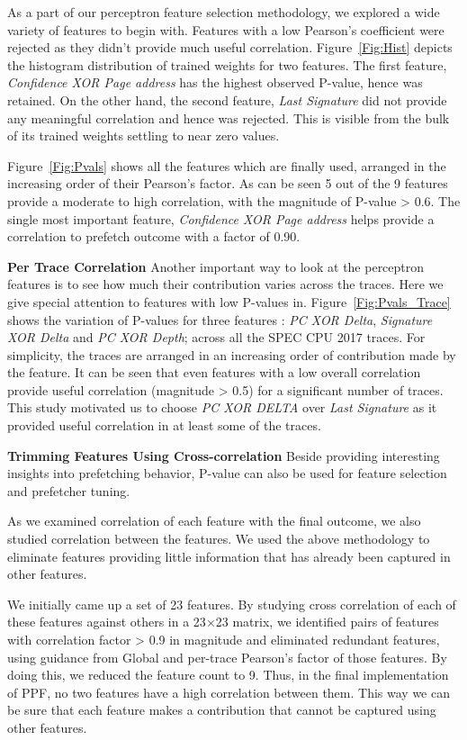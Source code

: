 As a part of our perceptron feature selection methodology, we explored
a wide variety of features to begin with. Features with a low
Pearson's coefficient were rejected as they didn't provide much useful
correlation.  Figure~\ref{Fig:Hist} depicts the histogram distribution
of trained weights for two features.  The first feature,
\textit{Confidence XOR Page address} has the highest observed P-value,
hence was retained.  On the other hand, the second feature,
\textit{Last Signature} did not provide any meaningful correlation and
hence was rejected.  This is visible from the bulk of its trained
weights settling to near zero values.

Figure~\ref{Fig:Pvals} shows all the features which are finally used,
arranged in the increasing order of their Pearson's factor.  As can be
seen 5 out of the 9 features provide a moderate to high correlation,
with the magnitude of P-value > 0.6. The single most important
feature, \textit{Confidence XOR Page address} helps provide
a correlation to prefetch outcome with a factor of 0.90. 

\noindent \textbf{Per Trace Correlation} Another important way to look
at the perceptron features is to see how much their contribution
varies across the traces. Here we give special attention to features
with low P-values in. Figure~\ref{Fig:Pvals_Trace} shows the variation
of P-values for three features : \textit{PC XOR Delta},
\textit{Signature XOR Delta} and \textit{PC XOR Depth}; across all the
SPEC CPU 2017 traces.  For simplicity, the traces are arranged in an
increasing order of contribution made by the feature.  It can be seen
that even features with a low overall correlation provide useful
correlation (magnitude > 0.5) for a significant number of traces. This
study motivated us to choose \textit{PC XOR DELTA} over \textit{Last
  Signature} as it provided useful correlation in at least some of the
traces.

\noindent \textbf{Trimming Features Using Cross-correlation} Beside
providing interesting insights into prefetching behavior, P-value can
also be used for feature selection and prefetcher tuning.

As we examined correlation of each feature with the final outcome, we
also studied correlation between the features.  We used the above
methodology to eliminate features providing little information that
has already been captured in other features.

We initially came up a set of 23 features.  By studying cross
correlation of each of these features against others in a 23$\times$23
matrix, we identified pairs of features with correlation factor > 0.9
in magnitude and eliminated redundant features, using guidance from
Global and per-trace Pearson's factor of those features.  By doing
this, we reduced the feature count to 9.  Thus, in the final
implementation of PPF, no two features have a high correlation between
them. This way we can be sure that each feature makes a contribution
that cannot be captured using other features.

